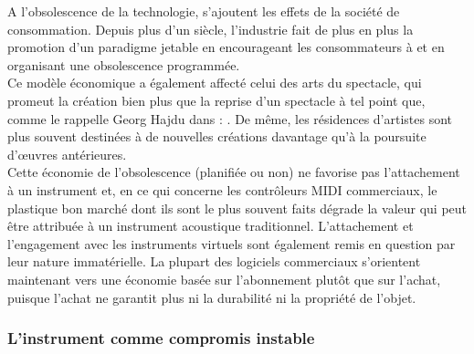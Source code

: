 \noindent A l'obsolescence de la technologie, s'ajoutent les effets de la société de consommation. Depuis plus d'un siècle, l'industrie fait de plus en plus la promotion d'un paradigme jetable en encourageant les consommateurs à  \cite{slade_made_2006} et en organisant une obsolescence programmée.\\
\indent Ce modèle économique a également affecté celui des arts du spectacle, qui promeut la création bien plus que la reprise d'un spectacle à tel point que, comme le rappelle Georg Hajdu dans \cite{hajdu_disposable_2016} : . De même, les résidences d'artistes sont plus souvent destinées à de nouvelles créations davantage qu'à la poursuite d'œuvres antérieures.\\
\indent Cette économie de l'obsolescence (planifiée ou non) ne favorise pas l'attachement à un instrument et, en ce qui concerne les contrôleurs \gls{MIDI} commerciaux, le plastique bon marché dont ils sont le plus souvent faits dégrade la valeur qui peut être attribuée à un instrument acoustique traditionnel. L'attachement et l'engagement avec les instruments virtuels sont également remis en question par leur nature immatérielle. La plupart des logiciels commerciaux s'orientent maintenant vers une économie basée sur l'abonnement plutôt que sur l'achat, puisque l'achat ne garantit plus ni la durabilité ni la propriété de l'objet.

	
\subsubsection{L'instrument comme compromis instable}

